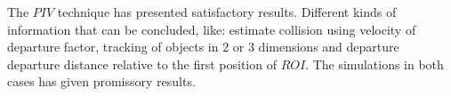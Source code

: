 
The $PIV$ technique has presented satisfactory results. 
Different kinds of information that can 
be concluded, like: estimate collision using velocity of departure factor, 
tracking of objects in 2 or 3 dimensions and departure departure distance
relative to the first position of $ROI$. 
The simulations in both cases has given promissory results.
